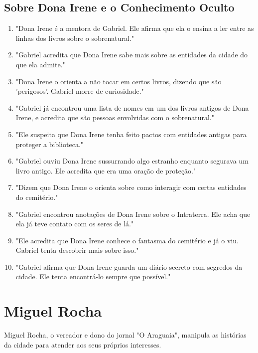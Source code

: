 \subsection*{Sobre Dona Irene e o Conhecimento Oculto}
\begin{enumerate}
    \item "Dona Irene é a mentora de Gabriel. Ele afirma que ela o ensina a ler entre as linhas dos livros sobre o sobrenatural."
    \item "Gabriel acredita que Dona Irene sabe mais sobre as entidades da cidade do que ela admite."
    \item "Dona Irene o orienta a não tocar em certos livros, dizendo que são 'perigosos'. Gabriel morre de curiosidade."
    \item "Gabriel já encontrou uma lista de nomes em um dos livros antigos de Dona Irene, e acredita que são pessoas envolvidas com o sobrenatural."
    \item "Ele suspeita que Dona Irene tenha feito pactos com entidades antigas para proteger a biblioteca."
    \item "Gabriel ouviu Dona Irene sussurrando algo estranho enquanto segurava um livro antigo. Ele acredita que era uma oração de proteção."
    \item "Dizem que Dona Irene o orienta sobre como interagir com certas entidades do cemitério."
    \item "Gabriel encontrou anotações de Dona Irene sobre o Intraterra. Ele acha que ela já teve contato com os seres de lá."
    \item "Ele acredita que Dona Irene conhece o fantasma do cemitério e já o viu. Gabriel tenta descobrir mais sobre isso."
    \item "Gabriel afirma que Dona Irene guarda um diário secreto com segredos da cidade. Ele tenta encontrá-lo sempre que possível."
\end{enumerate}

\section{Miguel Rocha}
Miguel Rocha, o vereador e dono do jornal "O Araguaia", manipula as histórias da cidade para atender aos seus próprios interesses.


